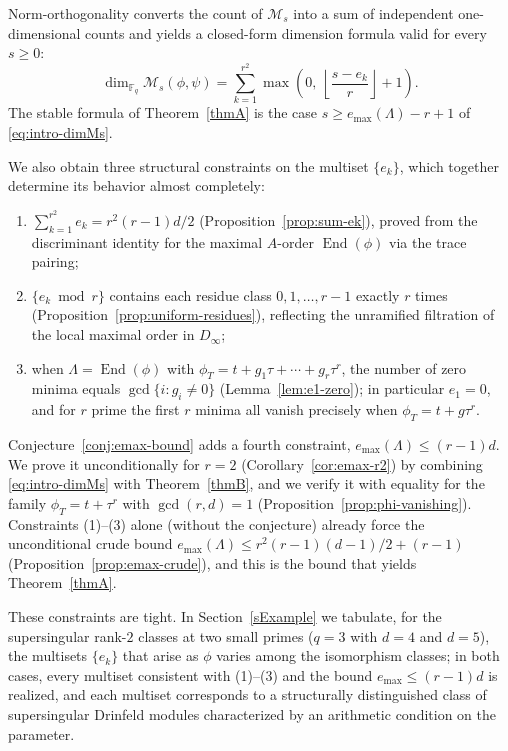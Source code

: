 \documentclass[12pt]{amsart}
\theoremstyle{definition}
\theoremstyle{remark}
\numberwithin{equation}{section}
\numberwithin{thm}{section}
\DeclareMathOperator{\End}{End}
\newcommand{\cM}{\mathcal{M}}
\newcommand{\F}{\mathbb{F}}
\newcommand{\La}{\Lambda}
\begin{document}
	Norm-orthogonality converts the count of $\cM_s$ into a sum of independent one-dimensional counts and yields a closed-form dimension formula valid for every $s\geq 0$:
	\begin{equation}\label{eq:intro-dimMs}
		\dim_{\F_q}\cM_s(\phi, \psi) = \sum_{k=1}^{r^2} \max\!\left(0,\ \left\lfloor\frac{s - e_k}{r}\right\rfloor + 1\right). 
	\end{equation}
	The stable formula of Theorem~\ref{thmA} is the case $s\geq e_{\max}(\La) - r + 1$ of \eqref{eq:intro-dimMs}.
	
	We also obtain three structural constraints on the multiset $\{e_k\}$, which together determine its behavior almost completely:
	\begin{enumerate}
		\item[(1)] $\sum_{k=1}^{r^2} e_k = r^2(r-1)d/2$ (Proposition~\ref{prop:sum-ek}), proved from the discriminant identity for the maximal $A$-order $\End(\phi)$ via the trace pairing;
		\item[(2)] $\{e_k \bmod r\}$ contains each residue class $0, 1, \ldots, r-1$ exactly $r$ times (Proposition~\ref{prop:uniform-residues}), reflecting the unramified filtration of the local maximal order in $D_\infty$;
		\item[(3)] when $\La = \End(\phi)$ with $\phi_T = t + g_1\tau + \cdots + g_r\tau^r$, the number of zero minima equals $\gcd\{i : g_i \neq 0\}$ (Lemma~\ref{lem:e1-zero}); in particular $e_1 = 0$, and for $r$ prime the first $r$ minima all vanish precisely when $\phi_T = t + g\tau^r$.
	\end{enumerate}
	Conjecture~\ref{conj:emax-bound} adds a fourth constraint, $e_{\max}(\La) \leq (r-1)d$. We prove it unconditionally for $r = 2$ (Corollary~\ref{cor:emax-r2}) by combining \eqref{eq:intro-dimMs} with Theorem~\ref{thmB}, and we verify it with equality for the family $\phi_T = t + \tau^r$ with $\gcd(r,d) = 1$ (Proposition~\ref{prop:phi-vanishing}). Constraints (1)--(3) alone (without the conjecture) already force the unconditional crude bound $e_{\max}(\La) \leq r^2(r-1)(d-1)/2 + (r-1)$ (Proposition~\ref{prop:emax-crude}), and this is the bound that yields Theorem~\ref{thmA}.
	
	These constraints are tight. In Section~\ref{sExample} we tabulate, for the supersingular rank-$2$ classes at two small primes ($q = 3$ with $d = 4$ and $d = 5$), the multisets $\{e_k\}$ that arise as $\phi$ varies among the isomorphism classes; in both cases, every multiset consistent with (1)--(3) and the bound $e_{\max}\leq (r-1)d$ is realized, and each multiset corresponds to a structurally distinguished class of supersingular Drinfeld modules characterized by an arithmetic condition on the parameter.
	
\end{document}
